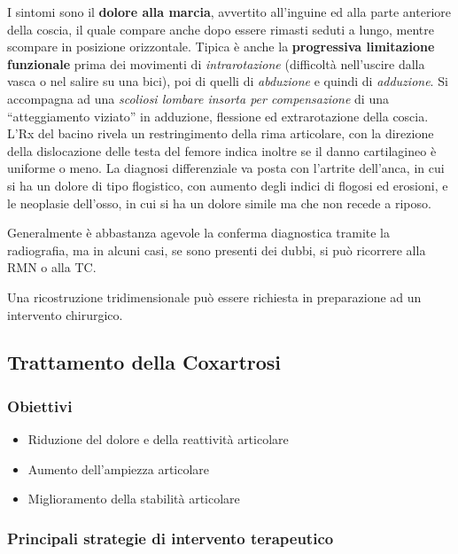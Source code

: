I sintomi sono il \textbf{dolore alla marcia}, avvertito all'inguine ed alla parte anteriore della coscia, il quale compare anche dopo essere rimasti seduti a lungo, mentre scompare in posizione orizzontale. Tipica è anche la \textbf{progressiva limitazione funzionale} prima dei
movimenti di \emph{intrarotazione} (difficoltà nell'uscire dalla vasca o nel salire su una bici), poi di quelli di \emph{abduzione} e quindi di \emph{adduzione}. Si accompagna ad una \emph{scoliosi lombare insorta
per compensazione} di una ``atteggiamento viziato'' in adduzione, flessione ed extrarotazione della coscia. L'Rx del bacino rivela un restringimento della rima articolare, con la direzione della dislocazione delle testa del femore indica inoltre se il danno cartilagineo è uniforme o meno. La diagnosi differenziale va posta con l'artrite dell'anca, in cui si ha un dolore di tipo flogistico, con aumento degli indici di flogosi ed erosioni, e le neoplasie dell'osso, in cui si ha un dolore simile ma che non recede a riposo.

Generalmente è abbastanza agevole la conferma diagnostica tramite la radiografia, ma in alcuni casi, se sono presenti dei dubbi, si può ricorrere alla RMN o alla TC.

Una ricostruzione tridimensionale può essere richiesta in preparazione ad un intervento chirurgico.

\subsection{Trattamento della Coxartrosi}

\subsubsection{Obiettivi}

\begin{itemize}
\item Riduzione del dolore e della reattività articolare
\item Aumento dell'ampiezza articolare
\item Miglioramento della stabilità articolare
\end{itemize}

\subsubsection{Principali strategie di intervento terapeutico}

